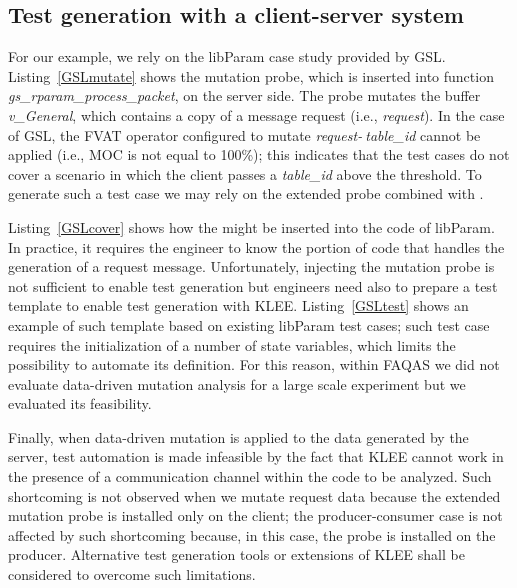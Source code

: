 \clearpage
\subsection{Test generation with a client-server system}

\STARTCHANGEDWPT

For our example, we rely on the libParam case study provided by GSL. Listing~\ref{GSLmutate} shows the mutation probe, which is inserted into function \emph{gs\_rparam\_process\_packet}, on the server side. The probe mutates the buffer \emph{v\_General}, which contains a copy of a message request (i.e., \emph{request}). In the case of GSL, the FVAT operator configured to mutate \emph{request-$\>$table\_id} cannot be applied (i.e., MOC is not equal to 100\%); this indicates that the test cases do not cover a scenario in which the client passes a \emph{table\_id} above the threshold. To generate such a test case we may rely on the extended probe combined with .

Listing~\ref{GSLcover} shows how the  might be inserted into the code of libParam. In practice, it requires the engineer to know the portion of code that handles the generation of a request message. Unfortunately, injecting the mutation probe is not sufficient to enable test generation but engineers need also to prepare a test template to enable test generation with KLEE. Listing~\ref{GSLtest} shows an example of such template based on existing libParam test cases; such test case requires the initialization of a number of state variables, which limits the possibility to automate its definition. For this reason, within FAQAS we did not evaluate data-driven mutation analysis for a large scale experiment but we evaluated its feasibility.

Finally, when data-driven mutation is applied to the data generated by the server, test automation is made infeasible by the fact that KLEE cannot work in the presence of a communication channel within the code to be analyzed. Such shortcoming is not observed when we mutate request data because the extended mutation probe is installed only on the client; the producer-consumer case is not affected by such shortcoming because, in this case, the probe is installed on the producer. Alternative test generation tools or extensions of KLEE shall be considered to overcome such limitations.







\ENDCHANGEDWPT
